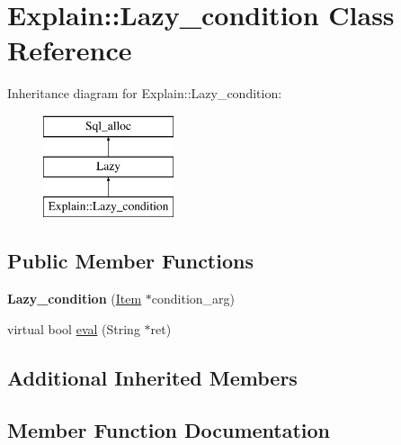 \hypertarget{classExplain_1_1Lazy__condition}{}\section{Explain\+:\+:Lazy\+\_\+condition Class Reference}
\label{classExplain_1_1Lazy__condition}
Inheritance diagram for Explain\+:\+:Lazy\+\_\+condition\+:\begin{figure}[H]
\begin{center}
\leavevmode
\includegraphics[height=3.000000cm]{classExplain_1_1Lazy__condition}
\end{center}
\end{figure}
\subsection*{Public Member Functions}
\begin{DoxyCompactItemize}
\item 
\mbox{\label{classExplain_1_1Lazy__condition_a73a422dee74d776264974cc4fc9ac7ab}} 
{\bfseries Lazy\+\_\+condition} (\mbox{\hyperlink{classItem}{Item}} $\ast$condition\+\_\+arg)
\item 
virtual bool \mbox{\hyperlink{classExplain_1_1Lazy__condition_a08922d6b5a4f18321486a7debecf5d02}{eval}} (String $\ast$ret)
\end{DoxyCompactItemize}
\subsection*{Additional Inherited Members}


\subsection{Member Function Documentation}
\mbox{\label{classExplain_1_1Lazy__condition_a08922d6b5a4f18321486a7debecf5d02}} 
